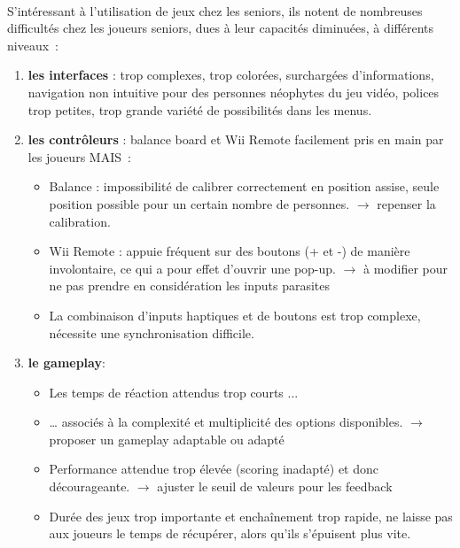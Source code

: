 \paragraph{}
S'intéressant à l'utilisation de jeux chez les seniors, ils notent de nombreuses difficultés chez les joueurs seniors, dues à leur capacités diminuées, à différents niveaux~:
\begin{enumerate}
	\item \textbf{les interfaces} : trop complexes, trop colorées, surchargées d'informations, navigation non intuitive pour des personnes néophytes du jeu vidéo, polices trop petites, trop grande variété de possibilités dans les menus.
	\item \textbf{les contrôleurs} : balance board et Wii Remote facilement pris en main par les joueurs MAIS~:
	\begin{itemize}
		\item Balance : impossibilité de calibrer correctement en position assise, seule position possible pour un certain nombre de personnes. \newline
		$\rightarrow$ repenser la calibration.
		\item  Wii Remote : appuie fréquent sur des boutons (+ et -) de manière involontaire, ce qui a pour effet d'ouvrir une pop-up.\newline
		$\rightarrow$ à modifier pour ne pas prendre en considération les inputs parasites
		\item La combinaison d'inputs haptiques et de boutons est trop complexe, nécessite une synchronisation difficile.
	\end{itemize}
	\item \textbf{le gameplay}:
	\begin{itemize}
		\item Les temps de réaction attendus trop courts ...
		\item … associés à la complexité et multiplicité des options disponibles.\newline
		$\rightarrow$ proposer un gameplay adaptable ou adapté
		\item Performance attendue trop élevée (scoring inadapté) et donc décourageante.\newline
		$\rightarrow$ ajuster le seuil de valeurs pour les feedback
		\item Durée des jeux trop importante et enchaînement trop rapide, ne laisse pas aux joueurs le temps de récupérer, alors qu'ils s'épuisent plus vite.
	\end{itemize}	
\end{enumerate}
